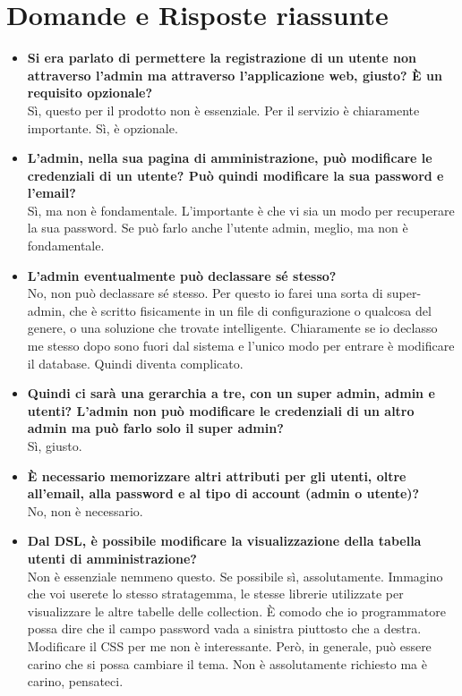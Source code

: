 \section{Domande e Risposte riassunte}
	\begin{itemize} 
		\item
		{\bfseries Si era parlato di permettere la registrazione di un utente non attraverso l'admin ma attraverso l'applicazione web, giusto? È un requisito opzionale?} \\
		Sì, questo per il prodotto non è essenziale. Per il servizio è chiaramente importante. Sì, è opzionale.
		
		\item
		{\bfseries L'admin, nella sua pagina di amministrazione, può modificare le credenziali di un utente? Può quindi modificare la sua password e l'email?} \\
		Sì, ma non è fondamentale. L'importante è che vi sia un modo per recuperare la sua password. Se può farlo anche l'utente admin, meglio, ma non è fondamentale.
		
		\item
		{\bfseries L'admin eventualmente può declassare sé stesso?} \\
		No, non può declassare sé stesso. Per questo io farei una sorta di super-admin, che è scritto fisicamente in un file di configurazione o qualcosa del genere, o una soluzione che trovate intelligente. Chiaramente se io declasso me stesso dopo sono fuori dal sistema e l'unico modo per entrare è modificare il database. Quindi diventa complicato.
		
		\item
		{\bfseries Quindi ci sarà una gerarchia a tre, con un super admin, admin e utenti? L'admin non può modificare le credenziali di un altro admin ma può farlo solo il super admin?} \\
		Sì, giusto.
		
		\item
		{\bfseries È necessario memorizzare altri attributi per gli utenti, oltre all'email, alla password e al tipo di account (admin o utente)?} \\
		No, non è necessario.
		
		\item
		{\bfseries Dal DSL, è possibile modificare la visualizzazione della tabella utenti di amministrazione?} \\
		Non è essenziale nemmeno questo. Se possibile sì, assolutamente. Immagino che voi userete lo stesso stratagemma, le stesse librerie utilizzate per visualizzare le altre tabelle delle collection.
		È comodo che io programmatore possa dire che il campo password vada a sinistra piuttosto che a destra. Modificare il CSS per me non è interessante. Però, in generale, può essere carino che si possa cambiare il tema. Non è assolutamente richiesto ma è carino, pensateci.
		

\end{itemize}
